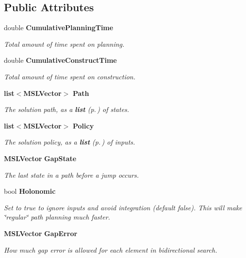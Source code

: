 \subsection*{Public Attributes}
\begin{CompactItemize}
\item 
double {\bf Cumulative\-Planning\-Time}
\begin{CompactList}\small\item\em Total amount of time spent on planning.\item\end{CompactList}\item 
double {\bf Cumulative\-Construct\-Time}
\begin{CompactList}\small\item\em Total amount of time spent on construction.\item\end{CompactList}\item 
{\bf list}$<${\bf MSLVector}$>$ {\bf Path}
\begin{CompactList}\small\item\em The solution path, as a {\bf list} {\rm (p.\,\pageref{classlist})} of states.\item\end{CompactList}\item 
{\bf list}$<${\bf MSLVector}$>$ {\bf Policy}
\begin{CompactList}\small\item\em The solution policy, as a {\bf list} {\rm (p.\,\pageref{classlist})} of inputs.\item\end{CompactList}\item 
{\bf MSLVector} {\bf Gap\-State}
\begin{CompactList}\small\item\em The last state in a path before a jump occurs.\item\end{CompactList}\item 
bool {\bf Holonomic}
\begin{CompactList}\small\item\em Set to true to ignore inputs and avoid integration (default false). This will make \char`\"{}regular\char`\"{} path planning much faster.\item\end{CompactList}\item 
{\bf MSLVector} {\bf Gap\-Error}
\begin{CompactList}\small\item\em How much gap error is allowed for each element in bidirectional search.\item\end{CompactList}\item 

\end{CompactItemize}
